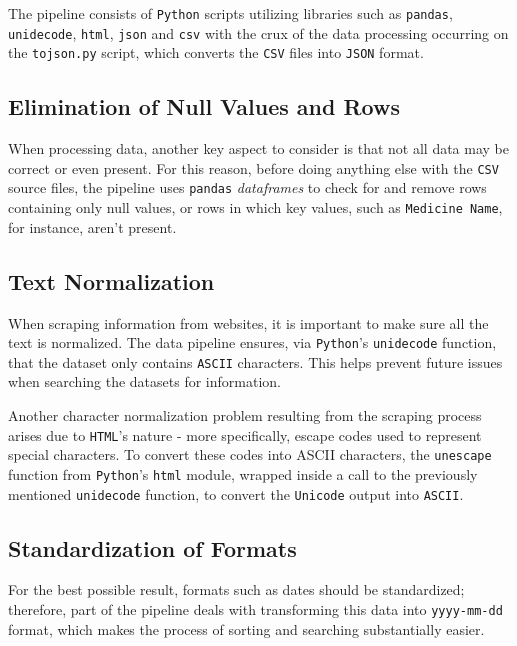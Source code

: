 \documentclass[sigconf]{acmart}
\begin{document}
The pipeline consists of \texttt{Python}\cite{python} scripts utilizing libraries such as \texttt{pandas}\cite{pandas}, \texttt{unidecode}\cite{unidecode}, \texttt{html}\cite{html}, \texttt{json}\cite{json} and \texttt{csv}\cite{csv} with the crux of the data processing occurring on the \texttt{to{\textunderscore}json.py} script, which converts the \texttt{CSV} files into \texttt{JSON} format.

\subsection{Elimination of Null Values and Rows}

When processing data, another key aspect to consider is that not all data may be correct or even present. For this reason, before doing anything else with the \texttt{CSV} source files, the pipeline uses \texttt{pandas} \textit{dataframes} to check for and remove rows containing only null values, or rows in which key values, such as \texttt{Medicine Name}, for instance, aren't present.

\subsection{Text Normalization}

When scraping information from websites, it is important to make sure all the text is normalized. The data pipeline ensures, via \texttt{Python}'s \texttt{unidecode} function, that the dataset only contains \texttt{ASCII} characters. This helps prevent future issues when searching the datasets for information.

Another character normalization problem resulting from the scraping process arises due to \texttt{HTML}'s nature - more specifically, escape codes used to represent special characters. To convert these codes into ASCII characters, the \texttt{unescape}\cite{html} function from \texttt{Python}'s \texttt{html} module, wrapped inside a call to the previously mentioned \texttt{unidecode} function, to convert the \texttt{Unicode} output into \texttt{ASCII}.

\subsection{Standardization of Formats}

For the best possible result, formats such as dates should be standardized; therefore, part of the pipeline deals with transforming this data into \texttt{yyyy-mm-dd} format, which makes the process of sorting and searching substantially easier. 
\end{document}
